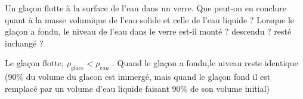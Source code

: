 \begin{Exercise}[title=Apéro]
		Un glaçon flotte à la surface de l’eau dans un verre. Que peut-on en conclure quant à la masse volumique de l’eau solide et celle de l’eau liquide ? Lorsque le glaçon a fondu, le niveau de l’eau
		dans le verre est-il monté ? descendu ? resté inchangé ?
\end{Exercise}
\begin{Answer}
	Le glaçon flotte, $\rho_{glace} < \rho_{eau}$ . Quand le glaçon a fondu,le niveau reste identique (90\% du volume du glacon est immergé, mais quand le glaçon fond il est remplacé par un  volume d'eau liquide faisant 90\% de son volume initial)
\end{Answer}
